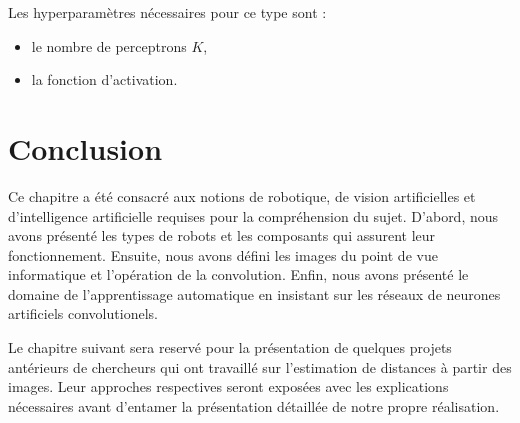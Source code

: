 Les hyperparamètres nécessaires pour ce type sont :

\begin{itemize}
  \item le nombre de perceptrons $K$,
  \item la fonction d'activation.
\end{itemize}

\section{Conclusion}

Ce chapitre a été consacré aux notions de robotique, de vision artificielles
et d'intelligence artificielle requises pour la compréhension du sujet.
D'abord, nous avons présenté les types de robots et les composants qui assurent leur
fonctionnement. Ensuite, nous avons défini les images du point de vue
informatique et l'opération de la convolution. Enfin, nous avons présenté le
domaine de l'apprentissage automatique en insistant sur les réseaux de
neurones artificiels convolutionels.

Le chapitre suivant sera reservé pour la présentation de quelques projets antérieurs
de chercheurs qui ont travaillé sur l'estimation de distances à partir des images.
Leur approches respectives seront exposées avec les explications nécessaires avant
d'entamer la présentation détaillée de notre propre réalisation.
